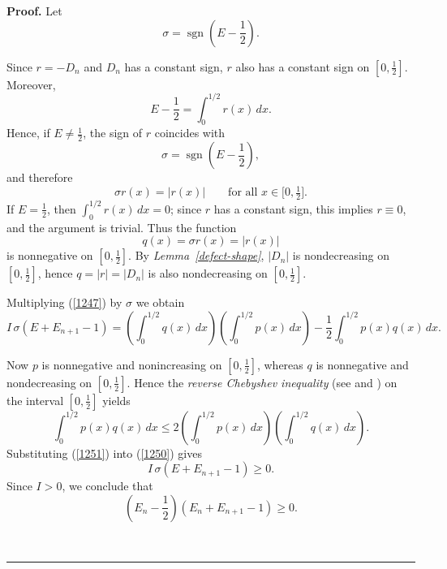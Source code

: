 \documentclass[onecolumn]{article}
\providecommand{\func}[1]{\operatorname{#1}}
\newenvironment{proof}[1][Proof]{\noindent\textbf{#1.} }{\ \rule{0.5em}{0.5em}}
\begin{document}
\begin{proof}
Let 
\begin{equation}
\sigma =\func{sgn}\!\left( E-\frac{1}{2}\right) .  \label{1248}
\end{equation}

Since $r=-D_{n}$ and $D_{n}$ has a constant sign, $r$ also has a constant
sign on $[0,\tfrac{1}{2}]$. Moreover, 
\begin{equation}
E-\frac{1}{2}=\int_{0}^{1/2}r(x)\,dx.  \label{1248.1}
\end{equation}%
Hence, if $E\neq \tfrac{1}{2}$, the sign of $r$ coincides with 
\begin{equation}
\sigma =\func{sgn}\!\left( E-\frac{1}{2}\right) ,  \label{1248.2}
\end{equation}%
and therefore 
\begin{equation}
\sigma r(x)=|r(x)|\qquad \text{for all }x\in \lbrack 0,\tfrac{1}{2}].
\label{1248.3}
\end{equation}%
If $E=\tfrac{1}{2}$, then $\int_{0}^{1/2}r(x)\,dx=0$; since $r$ has a
constant sign, this implies $r\equiv 0$, and the argument is trivial. Thus
the function 
\begin{equation}
q(x)=\sigma r(x)=|r(x)|  \label{1249}
\end{equation}%
is nonnegative on $[0,\tfrac{1}{2}]$. By \textit{Lemma~\ref{defect-shape}}, $%
|D_{n}|$ is nondecreasing on $[0,\tfrac{1}{2}]$, hence $q=|r|=|D_{n}|$ is
also nondecreasing on $[0,\tfrac{1}{2}]$.

Multiplying (\ref{1247}) by $\sigma $ we obtain 
\begin{equation}
I\,\sigma (E+E_{n+1}-1)=\left( \int_{0}^{1/2}q(x)\,dx\right) \left(
\int_{0}^{1/2}p(x)\,dx\right) -\frac{1}{2}\int_{0}^{1/2}p(x)q(x)\,dx.
\label{1250}
\end{equation}

Now $p$ is nonnegative and nonincreasing on $[0,\tfrac{1}{2}]$, whereas $q$
is nonnegative and nondecreasing on $[0,\tfrac{1}{2}]$. Hence the \textit{%
reverse Chebyshev inequality }(see \cite{[66]} and \cite[Chapter 9]{[32]})
on the interval $[0,\tfrac{1}{2}]$ yields 
\begin{equation}
\int_{0}^{1/2}p(x)q(x)\,dx\leq 2\left( \int_{0}^{1/2}p(x)\,dx\right) \left(
\int_{0}^{1/2}q(x)\,dx\right) .  \label{1251}
\end{equation}%
Substituting (\ref{1251}) into (\ref{1250}) gives 
\begin{equation}
I\,\sigma (E+E_{n+1}-1)\geq 0.  \label{1252}
\end{equation}%
Since $I>0$, we conclude that 
\begin{equation}
\left( E_{n}-\frac{1}{2}\right) \left( E_{n}+E_{n+1}-1\right) \geq 0.
\label{1253}
\end{equation}


\end{proof}
\end{document}
